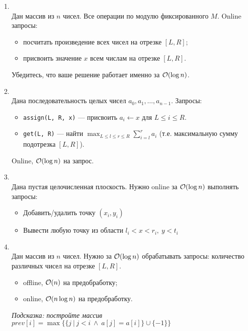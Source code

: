 \begin{enumerate}
  \item {}\\
    Дан массив из $n$ чисел. Все операции по модулю фиксированного $M$. Online запросы:
	\begin{itemize}
		\item посчитать произведение всех чисел на отрезке $[L, R]$;
		\item присвоить значение $x$ всем числам на отрезке $[L, R]$.
	\end{itemize}
	Убедитесь, что ваше решение работает именно за $\mathcal{O}(\log n)$.

  \item {}\\
    Дана последовательность целых чисел $a_0, a_1, \dots, a_{n-1}$. Запросы:
    \begin{itemize}
      \item \texttt{assign(L, R, x)} --- присвоить $a_i \leftarrow x$ для $L \le i \le R$.
      \item
        \texttt{get(L, R)} --- найти $\max_{L \le l \le r \le R} \sum_{i=l}^r a_i$
        (т.е. максимальную сумму подотрезка $[L, R]$).
    \end{itemize}
    Online, $\mathcal{O}(\log{n})$ на запрос.

  \item {}\\
    Дана пустая целочисленная плоскость. Нужно online за $\mathcal{O}(\log n)$ выполнять запросы:
    \begin{itemize}
      \item Добавить/удалить точку $(x_i, y_i)$
      \item Вывести любую точку из области $l_i < x < r_i,~ y < t_i$
    \end{itemize}

  \item {}\\
    Дан массив из $n$ чисел. Нужно за $\mathcal{O}(\log n)$ обрабатывать запросы: количество
    различных чисел на отрезке $[L, R]$.
        \begin{itemize}
            \item offline, $\mathcal{O}(n)$ на предобработку;
            \item online, $\mathcal{O}(n \log n)$ на предобработку.
        \end{itemize}
    \emph{Подсказка: постройте массив $prev[i] = \max \Big\lbrace \{ j ~|~ j < i ~\land~ a[j] = a[i] \} \cup \{-1\} \Big\rbrace$}



\end{enumerate}
